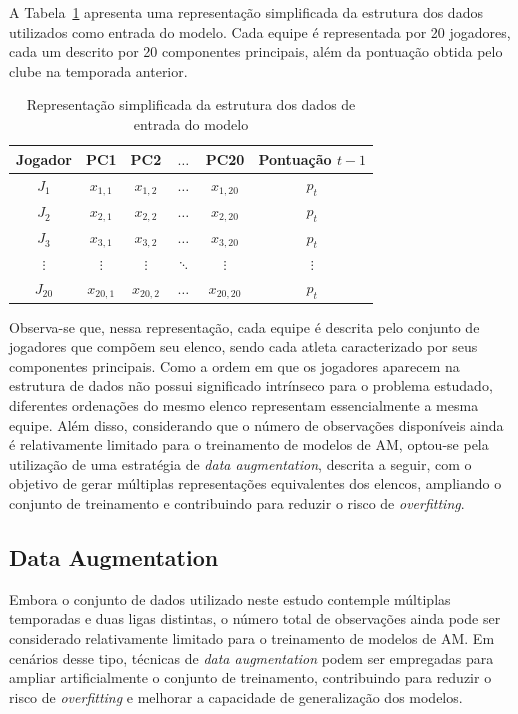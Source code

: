 A Tabela~\ref{tab:estrutura_dados} apresenta uma representação simplificada da estrutura
dos dados utilizados como entrada do modelo. Cada equipe é representada por 20 jogadores,
cada um descrito por 20 componentes principais, além da pontuação obtida pelo clube na
temporada anterior.

\begin{table}[H]
\centering
\caption{Representação simplificada da estrutura dos dados de entrada do modelo}
\label{tab:estrutura_dados}
\begin{tabular}{cccccc}
\toprule
Jogador & PC1 & PC2 & $\dots$ & PC20 & Pontuação $t-1$ \\
\midrule
$J_1$  & $x_{1,1}$ & $x_{1,2}$ & $\dots$ & $x_{1,20}$ & $p_t$ \\
$J_2$  & $x_{2,1}$ & $x_{2,2}$ & $\dots$ & $x_{2,20}$ & $p_t$ \\
$J_3$  & $x_{3,1}$ & $x_{3,2}$ & $\dots$ & $x_{3,20}$ & $p_t$ \\
$\vdots$ & $\vdots$ & $\vdots$ & $\ddots$ & $\vdots$ & $\vdots$ \\
$J_{20}$ & $x_{20,1}$ & $x_{20,2}$ & $\dots$ & $x_{20,20}$ & $p_t$ \\
\bottomrule
\end{tabular}
\end{table}

Observa-se que, nessa representação, cada equipe é descrita pelo conjunto de jogadores que
compõem seu elenco, sendo cada atleta caracterizado por seus componentes principais. Como
a ordem em que os jogadores aparecem na estrutura de dados não possui significado intrínseco
para o problema estudado, diferentes ordenações do mesmo elenco representam essencialmente
a mesma equipe. Além disso, considerando que o número de observações disponíveis ainda é
relativamente limitado para o treinamento de modelos de AM, optou-se pela utilização de uma
estratégia de \textit{data augmentation}, descrita a seguir, com o objetivo de gerar múltiplas
representações equivalentes dos elencos, ampliando o conjunto de treinamento e contribuindo
para reduzir o risco de \textit{overfitting}.

\subsection{Data Augmentation}

Embora o conjunto de dados utilizado neste estudo contemple múltiplas temporadas e duas ligas distintas, 
o número total de observações ainda pode ser considerado relativamente limitado para o treinamento de 
modelos de AM. Em cenários desse tipo, técnicas de \textit{data augmentation} podem 
ser empregadas para ampliar artificialmente o conjunto de treinamento, contribuindo para reduzir o risco 
de \textit{overfitting} e melhorar a capacidade de generalização dos modelos.

